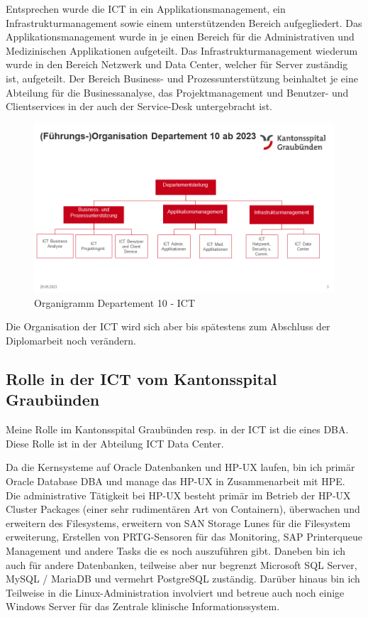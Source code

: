 Entsprechen wurde die ICT in ein Applikationsmanagement, ein Infrastrukturmanagement sowie einem unterstützenden Bereich aufgegliedert.
Das Applikationsmanagement wurde in je einen Bereich für die Administrativen und Medizinischen Applikationen aufgeteilt.
Das Infrastrukturmanagement wiederum wurde in den Bereich Netzwerk und Data Center, welcher für Server zuständig ist, aufgeteilt.
Der Bereich Business- und Prozessunterstützung beinhaltet je eine Abteilung für die Businessanalyse, das Projektmanagement und Benutzer- und Clientservices in der auch der Service-Desk untergebracht ist.
\begin{figure}[H]
    \centering
    \includegraphics[width=1\linewidth]{source/introduction/initial_situation/Organigramm-D10}
    \caption{Organigramm Departement 10 - ICT}
    \label{fig:Organigramm_D10}
\end{figure}

Die Organisation der ICT wird sich aber bis spätestens zum Abschluss der Diplomarbeit noch verändern.
\subsection{Rolle in der ICT vom Kantonsspital Graubünden}
Meine Rolle im Kantonsspital Graubünden resp. in der ICT ist die eines DBA.
Diese Rolle ist in der Abteilung ICT Data Center.

Da die Kernsysteme auf Oracle Datenbanken und \Gls{HP-UX} laufen, bin ich primär \Gls{Oracle Database} DBA und manage das \Gls{HP-UX} in Zusammenarbeit mit HPE.
Die administrative Tätigkeit bei \Gls{HP-UX} besteht primär im Betrieb der \Gls{HP-UX} Cluster Packages (einer sehr
rudimentären Art von Containern), überwachen und erweitern des Filesystems, erweitern von \Gls{SAN} Storage Lunes für die Filesystem erweiterung, Erstellen von \Gls{PRTG}-Sensoren für
das Monitoring, SAP Printerqueue Management und andere Tasks die es noch auszuführen gibt.
Daneben bin ich auch für andere Datenbanken, teilweise aber nur begrenzt \Gls{Microsoft SQL Server}, \Gls{MySQL} /
\Gls{MariaDB} und vermehrt \Gls{PostgreSQL} zuständig.
Darüber hinaus bin ich Teilweise in die \Gls{Linux}-Administration involviert und betreue auch noch einige Windows Server für das Zentrale klinische Informationssystem.

